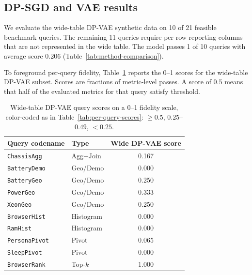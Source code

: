 \documentclass[12pt,letterpaper]{article}
\renewcommand{\_}{\textunderscore\allowbreak}
\newcommand{\tightlegendbox}[2]{\begingroup\setlength{\fboxsep}{1pt}\colorbox{#1}{#2}\endgroup}
\begin{document}
\subsection{DP-SGD and VAE results}

We evaluate the wide-table DP-VAE synthetic data on 10 of 21 feasible benchmark queries. The remaining 11 queries require per-row reporting columns that are not represented in the wide table. The model passes 1 of 10 queries with average score 0.206 (Table~\ref{tab:method-comparison}).

To foreground per-query fidelity, Table~\ref{tab:wide-dpsgd-scores} reports the 0--1 scores for the wide-table DP-VAE subset. Scores are fractions of metric-level passes. A score of 0.5 means that half of the evaluated metrics for that query satisfy threshold.

\begin{table}[H]
\centering
\small
\begin{tabular*}{\textwidth}{@{\extracolsep{\fill}}llc}
\toprule
\textbf{Query codename} & \textbf{Type} & \textbf{Wide DP-VAE score} \\
\midrule
\texttt{ChassisAgg} & Agg+Join & \cellcolor{scorelo}0.167 \\
\midrule
\texttt{BatteryDemo} & Geo/Demo & \cellcolor{scorelo}0.000 \\
\texttt{BatteryGeo} & Geo/Demo & \cellcolor{scoremid}0.250 \\
\texttt{PowerGeo} & Geo/Demo & \cellcolor{scoremid}0.333 \\
\texttt{XeonGeo} & Geo/Demo & \cellcolor{scoremid}0.250 \\
\midrule
\texttt{BrowserHist} & Histogram & \cellcolor{scorelo}0.000 \\
\texttt{RamHist} & Histogram & \cellcolor{scorelo}0.000 \\
\midrule
\texttt{PersonaPivot} & Pivot & \cellcolor{scorelo}0.065 \\
\texttt{SleepPivot} & Pivot & \cellcolor{scorelo}0.000 \\
\midrule
\texttt{BrowserRank} & Top-$k$ & \cellcolor{scorehi}1.000 \\
\bottomrule
\end{tabular*}
\caption{Wide-table DP-VAE query scores on a 0--1 fidelity scale, color-coded as in Table~\ref{tab:per-query-scores}: \tightlegendbox{scorehi}{$\geq 0.5$}, \tightlegendbox{scoremid}{$0.25$--$0.49$}, \tightlegendbox{scorelo}{$< 0.25$}.}
\label{tab:wide-dpsgd-scores}
\end{table}
\end{document}
